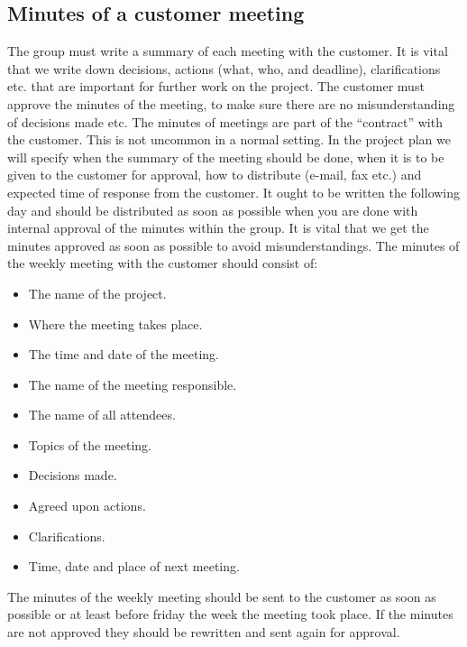 \subsection{Minutes of a customer meeting}
The group must write a summary of each meeting with the customer. It is vital that we write down decisions, actions (what, who, and deadline), clarifications etc. that are important for further work on the project. The customer must approve the minutes of the meeting, to make sure there are no misunderstanding of decisions made etc. The minutes of meetings are part of the “contract” with the customer. This is not uncommon in a normal setting.
\newline
\newline
In the project plan we will specify when the summary of the meeting should be done, when it is to be given to the customer for approval, how to distribute (e-mail, fax etc.) and expected time of response from the customer. It ought to be written the following day and should be distributed as soon as possible when you are done with internal approval of the minutes within the group. It is vital that we get the minutes approved as soon as possible to avoid misunderstandings.
\newline
\newline
The minutes of the weekly meeting with the customer should consist of:
\begin{itemize}
\item{}The name of the project.
\item{}Where the meeting takes place.
\item{}The time and date of the meeting.
\item{}The name of the meeting responsible.
\item{}The name of all attendees.
\item{}Topics of the meeting.
\item{}Decisions made.
\item{}Agreed upon actions.
\item{}Clarifications.
\item{}Time, date and place of next meeting.
\end{itemize}

The minutes of the weekly meeting should be sent to the customer as soon as possible or at least before friday the week the meeting took place. If the minutes are not approved they should be rewritten and sent again for approval. 

